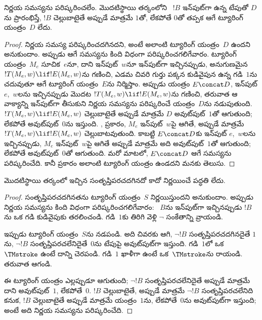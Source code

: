 \documentclass[../../../include/open-logic-section]{subfiles}
\begin{document}

\begin{thm}
నిర్ణయ సమస్యను పరిష్కరించలేం. మొదటిస్థాయి తర్కంలోని
~$!B$ ఇన్‌పుట్‌గా ఉన్న టేపుతో $D$ను ప్రారంభిస్తే,
$!B$ చెల్లుబాటైతే అప్పుడే మాత్రమే $1$తో, లేకపోతే $0$తో తప్పక ఆగే
ట్యూరింగ్ యంత్రం~$D$ లేదు.
\end{thm}

\begin{proof}
నిర్ణయ సమస్య పరిష్కరించదగినదని, అంటే అలాంటి ట్యూరింగ్ యంత్రం~$D$ ఉందని
అనుకుందాం. అప్పుడు ఆగే సమస్యను కింది విధంగా పరిష్కరించగలిగేవారం. ట్యూరింగ్
యంత్రం~$M_e$ సూచిక~$e$నూ, దాని ఇన్‌పుట్~$w$నూ ఇన్‌పుట్‌గా ఇచ్చినప్పుడు, అనుగుణమైన
~$!T(M_e,w) \lif !E(M_e,w)$ను గణించి, ఎడమ చివరి గుర్తు పక్కన
కుడివైపున ఉన్న గడి~$1$ను చదువుతూ ఆగే ట్యూరింగ్ యంత్రం~$E$ను నిర్మిస్తాం. అప్పుడు యంత్రం
$E\concat D$, ఇన్‌పుట్ $e$,~$w$లను ఇచ్చినప్పుడు మొదట
$!T(M_e,w) \lif !E(M_e,w)$ను గణించి, తరువాత ఆ వాక్యాన్ని ఇన్‌పుట్‌గా తీసుకుని నిర్ణయ సమస్యను
పరిష్కరించే యంత్రం~$D$ను నడుపుతుంది. $!T(M_e,w) \lif !E(M_e,w)$ చెల్లుబాటైతే
అప్పుడే మాత్రమే $D$ అవుట్‌పుట్~$1$తో ఆగుతుంది; లేకపోతే అవుట్‌పుట్~$0$ను
ఇస్తుంది. , 
ప్రకారం, $M_e$ ఇన్‌పుట్~$w$పై ఆగితే, అప్పుడే మాత్రమే
$!T(M_e,w) \lif !E(M_e,w)$ చెల్లుబాటవుతుంది. కాబట్టి $E\concat D$కు
ఇన్‌పుట్ $e$,~$w$లను ఇచ్చినప్పుడు, $M_e$ ఇన్‌పుట్~$w$పై ఆగితే అప్పుడే
మాత్రమే అది అవుట్‌పుట్~$1$తో ఆగుతుంది; లేకపోతే అవుట్‌పుట్~$0$తో ఆగుతుంది.
మరో మాటలో, $E\concat D$ ఆగే సమస్యను పరిష్కరించేది. కానీ
 ప్రకారం అలాంటి ట్యూరింగ్ యంత్రం ఉండదని
మనకు తెలుసు.
\end{proof}

\begin{cor}%
మొదటిస్థాయి తర్కంలో ఇచ్చిన  సంతృప్తిపరచదగినదో కాదో నిర్ణయించే పద్ధతి లేదు.
\end{cor}

\begin{proof}
  సంతృప్తిపరచదగినతను ట్యూరింగ్ యంత్రం~$S$ నిర్ణయిస్తుందని అనుకుందాం.
  అప్పుడు నిర్ణయ సమస్యను కింది విధంగా పరిష్కరించగలిగేవారం:
  ~$B$ను ఇన్‌పుట్‌గా ఇచ్చినప్పుడు $!B$ను ఒక గడి కుడివైపుకు
  తరలించండి. గడి~$1$కు తిరిగి వెళ్లి $\lnot$ సంకేతాన్ని వ్రాయండి.

  ఇప్పుడు ట్యూరింగ్ యంత్రం~$S$ను నడపండి. అది చివరకు ఆగి, $\lnot !B$
  సంతృప్తిపరచదగినదైతే $1$ను, $\lnot !B$ సంతృప్తిపరచలేనిదైతే~$0$ను
  టేపుపై అవుట్‌పుట్‌గా ఇస్తుంది. గడి~$1$లో ఒక~$\TMstroke$ ఉంటే దాన్ని
  చెరపండి. గడి~$1$ ఖాళీగా ఉంటే ఒక~$\TMstroke$ను రాయండి. తరువాత ఆగండి.

  ఈ ట్యూరింగ్ యంత్రం ఎల్లప్పుడూ ఆగుతుంది; $\lnot !B$ సంతృప్తిపరచలేనిదైతే
  అప్పుడే మాత్రమే దాని అవుట్‌పుట్~$1$, లేకపోతే~$0$. $!B$ చెల్లుబాటైతే,
  అప్పుడే మాత్రమే $\lnot !B$ సంతృప్తిపరచలేనిది కనుక, $!B$ చెల్లుబాటైతే
  అప్పుడే మాత్రమే యంత్రం~$1$ను, లేకపోతే~$0$ను అవుట్‌పుట్‌గా ఇస్తుంది;
  అంటే అది నిర్ణయ సమస్యను పరిష్కరించేది.
\end{proof}
\end{document}
